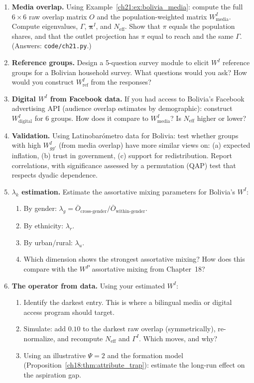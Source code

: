 \documentclass[../structural_economics_book.tex]{subfiles}
\begin{document}
\begin{enumerate}[label=\textbf{21.\arabic*}, leftmargin=3em]

\item \textbf{Media overlap.} Using Example~\ref{ch21:ex:bolivia_media}: compute the full $6 \times 6$ raw overlap matrix $O$ and the population-weighted matrix $W^I_{\text{media}}$. Compute eigenvalues, $\Gamma$, $\boldsymbol{\pi}^I$, and $N_{\text{eff}}$. Show that $\pi$ equals the population shares, and that the outlet projection has $\pi$ equal to reach and the same $\Gamma$. (Answers: \texttt{code/ch21.py}.)

\item \textbf{Reference groups.} Design a 5-question survey module to elicit $W^I$ reference groups for a Bolivian household survey. What questions would you ask? How would you construct $W^I_{\text{ref}}$ from the responses?

\item \textbf{Digital $W^I$ from Facebook data.} If you had access to Bolivia's Facebook advertising API (audience overlap estimates by demographic): construct $W^I_{\text{digital}}$ for 6 groups. How does it compare to $W^I_{\text{media}}$? Is $N_{\text{eff}}$ higher or lower?

\item \textbf{Validation.} Using Latinobar\'{o}metro data for Bolivia: test whether groups with high $W^I_{gg'}$ (from media overlap) have more similar views on: (a) expected inflation, (b) trust in government, (c) support for redistribution. Report correlations, with significance assessed by a permutation (QAP) test that respects dyadic dependence.

\item \textbf{$\lambda_k$ estimation.} Estimate the assortative mixing parameters for Bolivia's $W^I$:
\begin{enumerate}
\item By gender: $\lambda_g = \bar{O}_{\text{cross-gender}} / \bar{O}_{\text{within-gender}}$.
\item By ethnicity: $\lambda_r$.
\item By urban/rural: $\lambda_u$.
\item Which dimension shows the strongest assortative mixing? How does this compare with the $W^P$ assortative mixing from Chapter~18?
\end{enumerate}

\item \textbf{The operator from data.} Using your estimated $W^I$:
\begin{enumerate}
\item Identify the darkest entry. This is where a bilingual media or digital access program should target.
\item Simulate: add $0.10$ to the darkest raw overlap (symmetrically), re-normalize, and recompute $N_{\text{eff}}$ and $\Gamma^I$. Which moves, and why?
\item Using an illustrative $\Psi = 2$ and the formation model (Proposition~\ref{ch18:thm:attribute_trap}): estimate the long-run effect on the aspiration gap.
\end{enumerate}


\end{enumerate}
\end{document}
